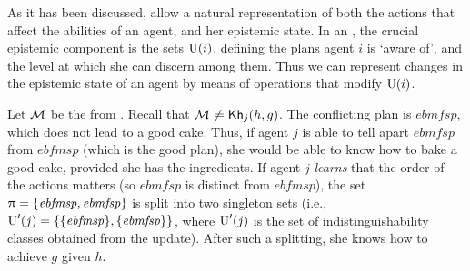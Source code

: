 As it has been discussed,  allow a natural representation of both the actions that affect the abilities of an agent, and her epistemic state. In an \ults, the crucial epistemic component is the sets $\operatorname{U}(i)$,
defining the plans agent $i$ is `aware of',
and the level at which she can discern among
them. Thus we can represent changes in the epistemic state of
an agent by means of operations that modify $\operatorname{U}(i)$. 
\medskip

\begin{example}\label{ex:ref}
    Let $\mathcal{M}$ be the \ults from .
    Recall that $\mathcal{M}\not\models{\sf Kh}_j(h,g)$. The conflicting plan is $\mathit{ebmfsp}$, which does not lead to a good cake. Thus, if agent $j$ is able to tell apart $\mathit{ebmfsp}$ from $\mathit{ebfmsp}$ (which is the good plan), she would be able to know how to bake a good cake, provided she has the ingredients. If agent $j$ \emph{learns} that the
    order of the actions matters (so $\mathit{ebmfsp}$ is distinct from $\mathit{ebfmsp}$), the set $\uppi=\{ \mathit{ebfmsp}, \mathit{ebmfsp} \}$ is split into two singleton sets (i.e., $\operatorname{U}'(j)=\{ \{ \mathit{ebfmsp} \},\{ \mathit{ebmfsp} \} \}$, where $\operatorname{U}'(j)$ is the set of indistinguishability classes obtained from the update). After such a splitting, she knows how to achieve $g$ given $h$.
\end{example}

\medskip




